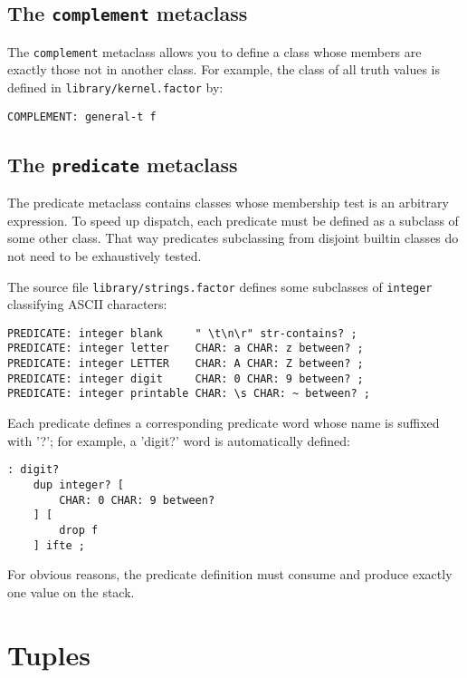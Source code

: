 \documentclass[english]{book}
\begin{document}
\subsection{The \texttt{complement} metaclass}

The \texttt{complement} metaclass allows you to define a class whose members
are exactly those not in another class. For example, the class of all
truth values is defined in \texttt{library/kernel.factor} by:

\begin{verbatim}
COMPLEMENT: general-t f
\end{verbatim}

\subsection{The \texttt{predicate} metaclass}

The predicate metaclass contains classes whose membership test is an
arbitrary expression. To speed up dispatch, each predicate must be
defined as a subclass of some other class. That way predicates
subclassing from disjoint builtin classes do not need to be
exhaustively tested.

The source file \texttt{library/strings.factor} defines some subclasses of \texttt{integer}
classifying ASCII characters:

\begin{verbatim}
PREDICATE: integer blank     " \t\n\r" str-contains? ;
PREDICATE: integer letter    CHAR: a CHAR: z between? ;
PREDICATE: integer LETTER    CHAR: A CHAR: Z between? ;
PREDICATE: integer digit     CHAR: 0 CHAR: 9 between? ;
PREDICATE: integer printable CHAR: \s CHAR: ~ between? ;
\end{verbatim}

Each predicate defines a corresponding predicate word whose name is
suffixed with '?'; for example, a 'digit?' word is automatically
defined:

\begin{verbatim}
: digit?
    dup integer? [
        CHAR: 0 CHAR: 9 between?
    ] [
        drop f
    ] ifte ;
\end{verbatim}

For obvious reasons, the predicate definition must consume and produce
exactly one value on the stack.

\section{Tuples}
\end{document}
